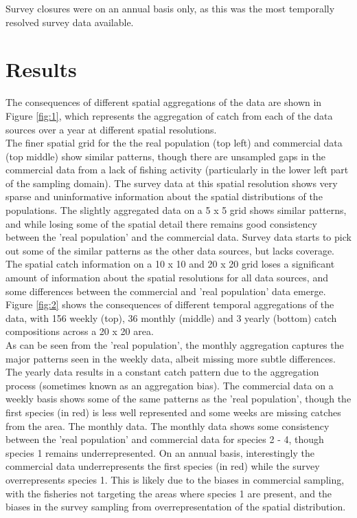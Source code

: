 \documentclass[review]{elsarticle}
\begin{document}
Survey closures were on an annual basis only, as this was the most temporally
resolved survey data available.

\section{Results}

The consequences of different spatial aggregations of the data are shown in
Figure \ref{fig:1}, which represents the aggregation of catch from each of the
data sources over a year at different spatial resolutions. \\

The finer spatial grid for the the real population (top left) and commercial
data (top middle) show similar patterns, though there are unsampled gaps in the
commercial data from a lack of fishing activity (particularly in the lower left
part of the sampling domain). The survey data at this spatial resolution shows
very sparse and uninformative information about the spatial distributions of
the populations. The slightly aggregated data on a 5 x 5 grid shows similar
patterns, and while losing some of the spatial detail there remains good
consistency between the 'real population' and the commercial data. Survey data
starts to pick out some of the similar patterns as the other data sources, but
lacks coverage. The spatial catch information on a 10 x 10 and 20 x 20 grid
loses a significant amount of information about the spatial resolutions for all
data sources, and some differences between the commercial and 'real population'
data emerge. \\

Figure \ref{fig:2} shows the consequences of different temporal aggregations of
the data, with 156 weekly (top), 36 monthly (middle) and 3 yearly (bottom)
catch compositions across a 20 x 20 area. \\

As can be seen from the 'real population', the monthly aggregation captures the
major patterns seen in the weekly data, albeit missing more subtle differences.
The yearly data results in a constant catch pattern due to the aggregation
process (sometimes known as an aggregation bias). The commercial data on a
weekly basis shows some of the same patterns as the 'real population', though
the first species (in red) is less well represented and some weeks are missing
catches from the area. The monthly data. The monthly data shows some
consistency between the 'real population' and commercial data for species 2 -
4, though species 1 remains underrepresented. On an annual basis, interestingly
the commercial data underrepresents the first species (in red) while the survey
overrepresents species 1. This is likely due to the biases in commercial
sampling, with the fisheries not targeting the areas where species 1 are
present, and the biases in the survey sampling from overrepresentation of the
spatial distribution. \\
\end{document}
